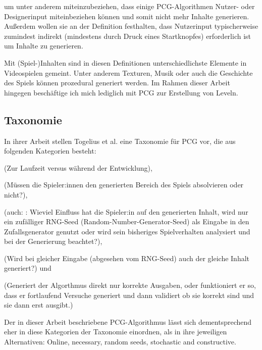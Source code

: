 um unter anderem miteinzubeziehen, dass einige PCG-Algorithmen Nutzer- oder Designerinput miteinbeziehen können und somit nicht mehr  Inhalte generieren. Außerdem wollen sie an der Definition festhalten, dass Nutzerinput typischerweise zumindest indirekt (mindestens durch Druck eines Startknopfes) erforderlich ist um Inhalte zu generieren.

Mit (Spiel-)Inhalten sind in diesen Definitionen unterschiedlichste Elemente in Videospielen gemeint. Unter anderem Texturen, Musik oder auch die Geschichte des Spiels können prozedural generiert werden. Im Rahmen dieser Arbeit hingegen beschäftige ich mich lediglich mit PCG zur Erstellung von Leveln.

\subsection{Taxonomie}

In ihrer Arbeit \cite{sbpcg} stellen Togelius et al. eine Taxonomie für PCG vor, die aus folgenden Kategorien besteht:

 (Zur Laufzeit versus während der Entwicklung),

 (Müssen die Spieler:innen den generierten Bereich des Spiels absolvieren oder nicht?),

 (auch: : Wieviel Einfluss hat die Spieler:in auf den generierten Inhalt, wird nur ein zufälliger RNG-Seed (Random-Number-Generator-Seed) als Eingabe in den Zufallsgenerator genutzt oder wird sein bisheriges Spielverhalten analysiert und bei der Generierung beachtet?),


 (Wird bei gleicher Eingabe (abgesehen vom RNG-Seed) auch der gleiche Inhalt generiert?) und

 (Generiert der Algorthmus direkt nur korrekte Ausgaben, oder funktioniert er so, dass er fortlaufend Versuche generiert und dann validiert ob sie korrekt sind und sie dann erst ausgibt.) %


Der in dieser Arbeit beschriebene PCG-Algorithmus lässt sich dementsprechend eher in diese Kategorien der Taxonomie einordnen, als in ihre jeweiligen Alternativen: Online, necessary, random seeds,
 stochastic and constructive. %

